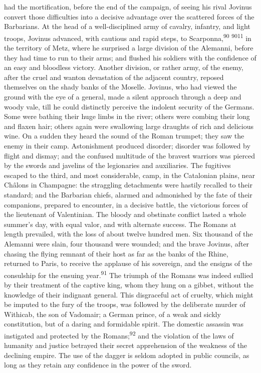 had the mortification, before the end of the campaign, of seeing
his rival Jovinus convert those difficulties into a decisive
advantage over the scattered forces of the Barbarians. At the
head of a well-disciplined army of cavalry, infantry, and light
troops, Jovinus advanced, with cautious and rapid steps, to
Scarponna,\textsuperscript{90} \textsuperscript{9011} in the territory of Metz, where he surprised a
large division of the Alemanni, before they had time to run to
their arms; and flushed his soldiers with the confidence of an
easy and bloodless victory. Another division, or rather army, of
the enemy, after the cruel and wanton devastation of the adjacent
country, reposed themselves on the shady banks of the Moselle.
Jovinus, who had viewed the ground with the eye of a general,
made a silent approach through a deep and woody vale, till he
could distinctly perceive the indolent security of the Germans.
Some were bathing their huge limbs in the river; others were
combing their long and flaxen hair; others again were swallowing
large draughts of rich and delicious wine. On a sudden they heard
the sound of the Roman trumpet; they saw the enemy in their camp.
Astonishment produced disorder; disorder was followed by flight
and dismay; and the confused multitude of the bravest warriors
was pierced by the swords and javelins of the legionaries and
auxiliaries. The fugitives escaped to the third, and most
considerable, camp, in the Catalonian plains, near Châlons in
Champagne: the straggling detachments were hastily recalled to
their standard; and the Barbarian chiefs, alarmed and admonished
by the fate of their companions, prepared to encounter, in a
decisive battle, the victorious forces of the lieutenant of
Valentinian. The bloody and obstinate conflict lasted a whole
summer’s day, with equal valor, and with alternate success. The
Romans at length prevailed, with the loss of about twelve hundred
men. Six thousand of the Alemanni were slain, four thousand were
wounded; and the brave Jovinus, after chasing the flying remnant
of their host as far as the banks of the Rhine, returned to
Paris, to receive the applause of his sovereign, and the ensigns
of the consulship for the ensuing year.\textsuperscript{91} The triumph of the
Romans was indeed sullied by their treatment of the captive king,
whom they hung on a gibbet, without the knowledge of their
indignant general. This disgraceful act of cruelty, which might
be imputed to the fury of the troops, was followed by the
deliberate murder of Withicab, the son of Vadomair; a German
prince, of a weak and sickly constitution, but of a daring and
formidable spirit. The domestic assassin was instigated and
protected by the Romans;\textsuperscript{92} and the violation of the laws of
humanity and justice betrayed their secret apprehension of the
weakness of the declining empire. The use of the dagger is seldom
adopted in public councils, as long as they retain any confidence
in the power of the sword.

